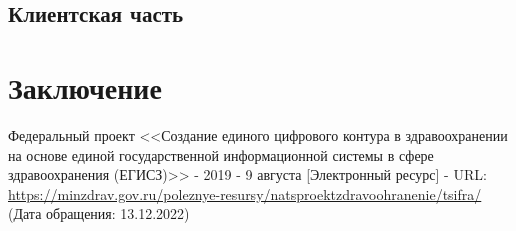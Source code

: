 \documentclass[a4paper,article]{article}
\begin{document}
    \subsection{Клиентская часть}

    \newpage

    \section*{Заключение}

    \newpage


    \begin{thebibliography}{}
         Федеральный проект <<Создание единого цифрового контура в здравоохранении на основе единой государственной информационной системы в сфере здравоохранения (ЕГИСЗ)>> - 2019 - 9 августа [Электронный ресурс] - URL: \url{https://minzdrav.gov.ru/poleznye-resursy/natsproektzdravoohranenie/tsifra/} (Дата обращения: 13.12.2022)
    \end{thebibliography}
\end{document}
